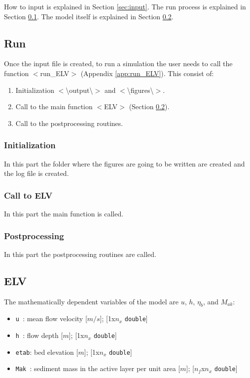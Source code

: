 \documentclass[a4paper, 11pt]{article}
\newcommand{\pathfile}[1]{$<$#1$>$}
\newcommand{\pathdir}[1]{$<$\textbackslash#1\textbackslash$>$}
\begin{document}
How to input is explained in Section \ref{sec:input}. The run process is explained in Section \ref{sec:run}. The model itself is explained in Section \ref{sec:elv}.


%
%
%
\subsection{Run}
%
\label{sec:run}
%
Once the input file is created, to run a simulation the user needs to call the function \pathfile{run\_ELV} (Appendix \ref{app:run_ELV}). This consist of:
\begin{enumerate}
\item Initialization \pathdir{output} and \pathdir{figures}.
\item Call to the main function \pathfile{ELV} (Section \ref{sec:elv}).
\item Call to the postprocessing routines. 
\end{enumerate}

%
\subsubsection{Initialization}
\label{subsec:run_ini}

In this part the folder where the figures are going to be written are created and the log file is created.

%
\subsubsection{Call to ELV}
\label{subsec:run_elv}

In this part the main function is called.

%
\subsubsection{Postprocessing}
\label{subsec:run_post}

In this part the postprocessing routines are called. 




%
%
%
%
\subsection{ELV}
%
\label{sec:elv}
%
The mathematically dependent variables of the model are $u$, $h$, $\eta_b$, and $M_{ak}$:
\begin{itemize}
\item \texttt{u   }: mean flow velocity [$m/s$]; [1x$n_x$ \texttt{double}]
\item \texttt{h   }: flow depth [$m$]; [1x$n_x$ \texttt{double}]
\item \texttt{etab}: bed elevation [$m$]; [1x$n_x$ \texttt{double}]
\item \texttt{Mak }: sediment mass in the active layer per unit area [$m$]; [$n_f$x$n_x$ \texttt{double}]
\end{itemize}
\end{document}
